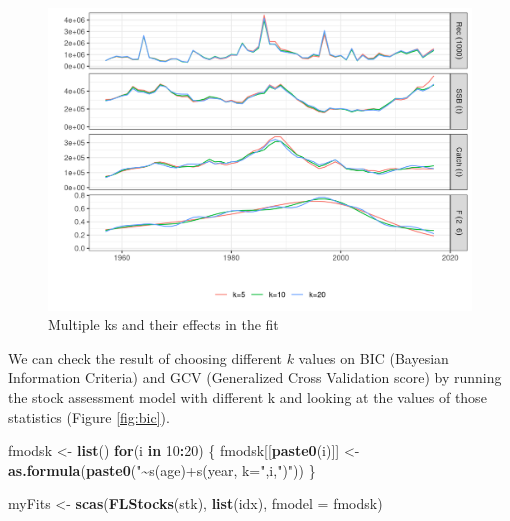 \documentclass[
]{book}
\newenvironment{Shaded}{\begin{snugshade}}{\end{snugshade}}
\newcommand{\AttributeTok}[1]{\textcolor[rgb]{0.13,0.29,0.53}{#1}}
\newcommand{\ControlFlowTok}[1]{\textcolor[rgb]{0.13,0.29,0.53}{\textbf{#1}}}
\newcommand{\DecValTok}[1]{\textcolor[rgb]{0.00,0.00,0.81}{#1}}
\newcommand{\FunctionTok}[1]{\textcolor[rgb]{0.13,0.29,0.53}{\textbf{#1}}}
\newcommand{\NormalTok}[1]{#1}
\newcommand{\OtherTok}[1]{\textcolor[rgb]{0.56,0.35,0.01}{#1}}
\newcommand{\SpecialCharTok}[1]{\textcolor[rgb]{0.81,0.36,0.00}{\textbf{#1}}}
\newcommand{\StringTok}[1]{\textcolor[rgb]{0.31,0.60,0.02}{#1}}
\begin{document}
\begin{figure}
\centering
\includegraphics{_bookdown_files/_main_files/figure-html/ks-1.png}
\caption{\label{fig:ks}Multiple ks and their effects in the fit}
\end{figure}

We can check the result of choosing different \(k\) values on BIC (Bayesian Information Criteria) and GCV (Generalized Cross Validation score) by running the stock assessment model with different k and looking at the values of those statistics (Figure \ref{fig:bic}).

\begin{Shaded}
\begin{Highlighting}[]
\NormalTok{fmodsk }\OtherTok{\textless{}{-}} \FunctionTok{list}\NormalTok{()}
\ControlFlowTok{for}\NormalTok{(i }\ControlFlowTok{in} \DecValTok{10}\SpecialCharTok{:}\DecValTok{20}\NormalTok{) \{}
\NormalTok{  fmodsk[[}\FunctionTok{paste0}\NormalTok{(i)]] }\OtherTok{\textless{}{-}} \FunctionTok{as.formula}\NormalTok{(}\FunctionTok{paste0}\NormalTok{(}\StringTok{"\textasciitilde{}s(age)+s(year, k="}\NormalTok{,i,}\StringTok{")"}\NormalTok{))}
\NormalTok{\}}

\NormalTok{myFits }\OtherTok{\textless{}{-}} \FunctionTok{scas}\NormalTok{(}\FunctionTok{FLStocks}\NormalTok{(stk), }\FunctionTok{list}\NormalTok{(idx), }\AttributeTok{fmodel =}\NormalTok{ fmodsk)}
\end{Highlighting}
\end{Shaded}
\end{document}
